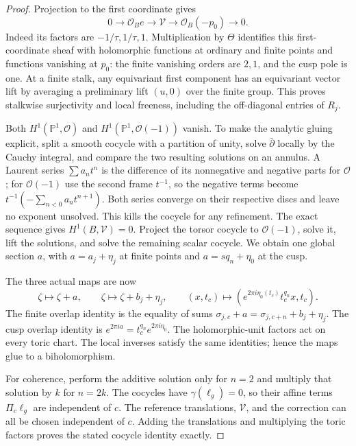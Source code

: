\begin{proof}
Projection to the first coordinate gives
\[
 0\longrightarrow\mathcal O_Be\longrightarrow\mathcal V
 \longrightarrow\mathcal O_B(-p_0)\longrightarrow0.
\]
Indeed its factors are $-1/\tau,1/\tau,1$. Multiplication by $\Theta$ identifies this first-coordinate sheaf with holomorphic functions at ordinary and finite points and functions vanishing at $p_0$: the finite vanishing orders are $2,1$, and the cusp pole is one. At a finite stalk, any equivariant first component has an equivariant vector lift by averaging a preliminary lift $(u,0)$ over the finite group. This proves stalkwise surjectivity and local freeness, including the off-diagonal entries of $R_j$.

Both $H^1(\mathbb P^1,\mathcal O)$ and $H^1(\mathbb P^1,\mathcal O(-1))$ vanish. To make the analytic gluing explicit, split a smooth cocycle with a partition of unity, solve $\bar\partial$ locally by the Cauchy integral, and compare the two resulting solutions on an annulus. A Laurent series $\sum a_nt^n$ is the difference of its nonnegative and negative parts for $\mathcal O$; for $\mathcal O(-1)$ use the second frame $t^{-1}$, so the negative terms become $t^{-1}(-\sum_{n<0}a_nt^{n+1})$. Both series converge on their respective discs and leave no exponent unsolved. This kills the cocycle for any refinement. The exact sequence gives $H^1(B,\mathcal V)=0$. Project the torsor cocycle to $\mathcal O(-1)$, solve it, lift the solutions, and solve the remaining scalar cocycle. We obtain one global section $a$, with $a=a_j+\eta_j$ at finite points and $a=sq_n+\eta_0$ at the cusp.

The three actual maps are now
\[
 \zeta\mapsto\zeta+a,\qquad
 \zeta\mapsto\zeta+b_j+\eta_j,\qquad
 (x,t_c)\mapsto(e^{2\pi i\eta_0(t_c)}t_c^{q_n}x,t_c).
\]
The finite overlap identity is the equality of sums
$\sigma_{j,c}+a=\sigma_{j,c+n}+b_j+\eta_j$. The cusp overlap identity is $e^{2\pi ia}=t_c^{q_n}e^{2\pi i\eta_0}$. The holomorphic-unit factors act on every toric chart. The local inverses satisfy the same identities; hence the maps glue to a biholomorphism.

For coherence, perform the additive solution only for $n=2$ and multiply that solution by $k$ for $n=2k$. The cocycles have $\gamma(\ell_g)=0$, so their affine terms $\Pi_c\ell_g$ are independent of $c$. The reference translations, $\mathcal V$, and the correction can all be chosen independent of $c$. Adding the translations and multiplying the toric factors proves the stated cocycle identity exactly.


\end{proof}
